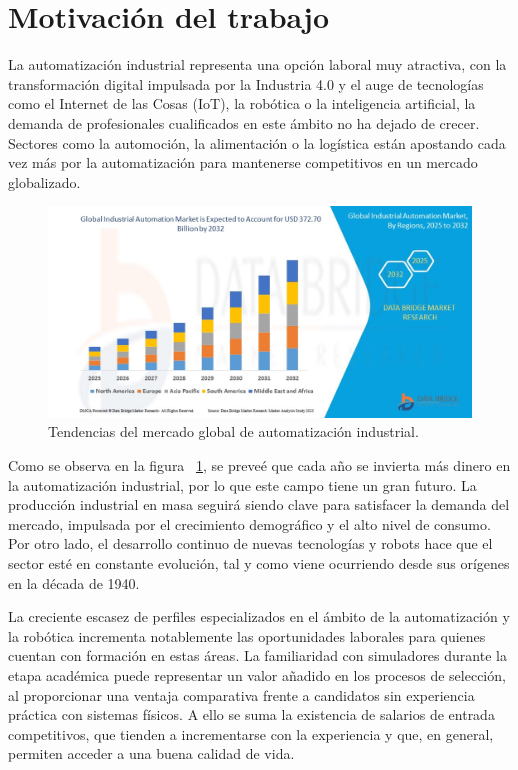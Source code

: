 \section{Motivación del trabajo}
\label{sec:cuartaseccion}

La automatización industrial representa una opción laboral muy atractiva, con la transformación digital impulsada por la Industria 4.0 y el auge de tecnologías como el Internet de las Cosas (IoT), la robótica o la inteligencia artificial, la demanda de profesionales cualificados en este ámbito no ha dejado de crecer. Sectores como la automoción, la alimentación o la logística están apostando cada vez más por la automatización para mantenerse competitivos en un mercado globalizado.

\newpage

\begin{figure} [h!]
  \begin{center}
    \includegraphics[width=15cm]{figs/grafico_futuro}
  \end{center}
  \caption{\centering Tendencias del mercado global de automatización industrial. \cite{grafico_empleabilidad}}
  \label{fig:grafico_futuro}
\end{figure} 

Como se observa en la figura  ~\ref{fig:grafico_futuro}, se preveé que cada año se invierta más dinero en la automatización industrial,
por lo que este campo tiene un gran futuro. La producción industrial en masa seguirá siendo clave para satisfacer la demanda del mercado, impulsada por el crecimiento demográfico y el alto nivel de consumo. Por otro lado, el desarrollo continuo de nuevas tecnologías y robots hace que el sector esté en constante evolución, tal y como viene ocurriendo desde sus orígenes en la década de 1940.

La creciente escasez de perfiles especializados en el ámbito de la automatización y la robótica incrementa notablemente las oportunidades laborales para quienes cuentan con formación en estas áreas. La familiaridad con simuladores durante la etapa académica puede representar un valor añadido en los procesos de selección, al proporcionar una ventaja comparativa frente a candidatos sin experiencia práctica con sistemas físicos. A ello se suma la existencia de salarios de entrada competitivos, que tienden a incrementarse con la experiencia y que, en general, permiten acceder a una buena calidad de vida.

